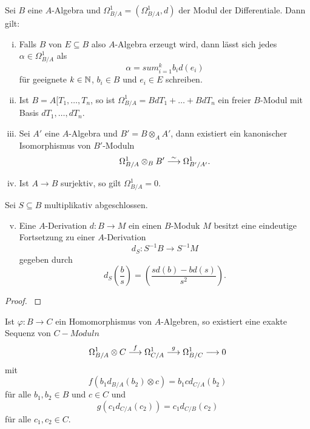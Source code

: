 \begin{lem}
\label{lem:13.4}
	Sei $B$ eine $A$-Algebra und $\Omega_{B/A}^1 = (\Omega_{B/A}^1, d)$ der Modul der Differentiale. Dann gilt:
	\begin{enumerate}[i)]
		\item\label{lem:13.4:i} Falls $B$ von $E\subseteq B$ also $A$-Algebra erzeugt wird, dann lässt sich jedes $\alpha \in \Omega_{B/A}^1$ als
		\[
			\alpha = sum_{i=1}^k b_i d(e_i)
		\]
		für geeignete $k \in \mathbb {N}$, $b_i\in B$ und $e_i \in E$ schreiben.
		\item\label{lem:13.4:ii} Ist $B=A[T_1,\ldots,T_n$, so ist $\Omega_{B/A}^1 = BdT_1+\ldots+BdT_n$ ein freier $B$-Modul mit Basis $dT_1,\ldots,dT_n$.
		\item\label{lem:13.4:iii} Sei $A'$ eine $A$-Algebra und $B' = B \otimes_A A'$, dann existiert ein kanonischer Isomorphismus von $B'$-Moduln
		\[
			\Omega_{B/A}^1\otimes_B B' \overset{\sim}{\longrightarrow} \Omega_{B'/A'}^1.
		\]
		\item\label{lem:13.4:iv} Ist $A \to B$ surjektiv, so gilt $\Omega_{B/A}^1 = 0$.
	\end{enumerate}
	Sei $S \subseteq B$ multiplikativ abgeschlossen.
	\begin{enumerate}[i)]
	\setcounter{enumi}{4}
		\item\label{lem:13.4:v} Eine $A$-Derivation $d\colon B \to M$ ein einen $B$-Moduk $M$ besitzt eine eindeutige Fortsetzung zu einer $A$-Derivation
		\[
			d_S\colon S^{-1}B \to S^{-1}M
		\]
		gegeben durch
		\[
			d_S \left(\frac{b}{s}\right) = \left(\frac{sd(b)-bd(s)}{s^2}\right).
		\]
	\end{enumerate}
	\begin{proof}
		\cite[{}II.8]{hartshorne1977algebraic}
	\end{proof}
\end{lem}

\begin{lem}
\label{lem:13.5}
	Ist $\varphi\colon B \to C$ ein Homomorphismus von $A$-Algebren, so existiert eine exakte Sequenz von $C-Moduln$
	\[
		\Omega_{B/A}^1\otimes C \overset{f}{\longrightarrow} \Omega_{C/A}^1 \overset{g}{\longrightarrow}\Omega_{B/C}^1\longrightarrow 0
	\]
	mit
	\[
		f(b_1d_{B/A}(b_2)\otimes c) = b_1 c d_{C/A}(b_2)
	\]
	für alle $b_1,b_2\in B$ und $c \in C$ und 
	\[
		g(c_1d_{C/A}(c_2)) = c_1d_{C/B}(c_2)
	\]
	für alle $c_1,c_2 \in C$.
\end{lem}

